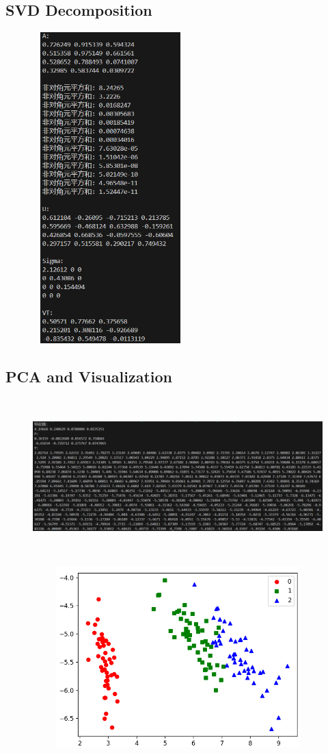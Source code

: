 \documentclass{ctexart}
\begin{document}
	\subsection{SVD Decomposition}
	\begin{figure}[H]
		\centering 
		\includegraphics[height=12cm,width=6cm]{3.png}
		\end{figure}
\subsection{PCA and Visualization}
		\begin{figure}[H]
			\centering 
			\includegraphics[height=6cm,width=14cm]{2.png}
			\end{figure}
			\begin{figure}[H]
				\centering 
				\includegraphics[height=7cm,width=12cm]{1.png}
				\end{figure}
\end{document}
